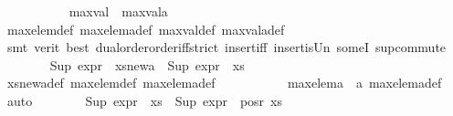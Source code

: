 \begin{isabellebody}
\ \ \ \ \ \ \ \ \isamarkupfalse%
\ {\isachardoublequoteopen}{}{\isachardoublequoteclose}\ {\isacartoucheopen}max{\isacharunderscore}{\kern0pt}val\ {\isasymle}\ max{\isacharunderscore}{\kern0pt}val{\isacharunderscore}{\kern0pt}a{\isacartoucheclose}\ {}\isanewline
\ \ \ \ \ \ \ \ \isamarkupfalse%
\ max{\isacharunderscore}{\kern0pt}elem{\isacharunderscore}{\kern0pt}def\ max{\isacharunderscore}{\kern0pt}elem{\isacharunderscore}{\kern0pt}a{\isacharunderscore}{\kern0pt}def\ max{\isacharunderscore}{\kern0pt}val{\isacharunderscore}{\kern0pt}def\ max{\isacharunderscore}{\kern0pt}val{\isacharunderscore}{\kern0pt}a{\isacharunderscore}{\kern0pt}def\isanewline
\ \ \ \ \ \ \ \ \isamarkupfalse%
\ {\isacharparenleft}{\kern0pt}smt\ {\isacharparenleft}{\kern0pt}verit{\isacharcomma}{\kern0pt}\ best{\isacharparenright}{\kern0pt}\ dual{\isacharunderscore}{\kern0pt}order{\isachardot}{\kern0pt}order{\isacharunderscore}{\kern0pt}iff{\isacharunderscore}{\kern0pt}strict\ insert{\isacharunderscore}{\kern0pt}iff\ insert{\isacharunderscore}{\kern0pt}is{\isacharunderscore}{\kern0pt}Un\ someI\ sup{\isachardot}{\kern0pt}commute{\isacharparenright}{\kern0pt}\isanewline
\ \ \ \ \ \ \isamarkupfalse%
\ {\isachardoublequoteopen}Sup\ {\isacharparenleft}{\kern0pt}expr{\isacharunderscore}{\kern0pt}{}\ {\isacharbackquote}{\kern0pt}\ xs{\isacharunderscore}{\kern0pt}new{\isacharunderscore}{\kern0pt}a{\isacharparenright}{\kern0pt}\ {\isasymge}\ Sup\ {\isacharparenleft}{\kern0pt}expr{\isacharunderscore}{\kern0pt}{}\ {\isacharbackquote}{\kern0pt}\ xs{\isacharparenright}{\kern0pt}{\isachardoublequoteclose}\isanewline
\ \ \ \ \ \ \ \ \isamarkupfalse%
\ xs{\isacharunderscore}{\kern0pt}new{\isacharunderscore}{\kern0pt}a{\isacharunderscore}{\kern0pt}def\ max{\isacharunderscore}{\kern0pt}elem{\isacharunderscore}{\kern0pt}def\ max{\isacharunderscore}{\kern0pt}elem{\isacharunderscore}{\kern0pt}a{\isacharunderscore}{\kern0pt}def\isanewline
\ \ \ \ \ \ \ \ \isamarkupfalse%
\ {\isachardoublequoteopen}{}{\isachardoublequoteclose}\ {\isacartoucheopen}max{\isacharunderscore}{\kern0pt}elem{\isacharunderscore}{\kern0pt}a\ {\isacharequal}{\kern0pt}\ a{\isacartoucheclose}\ max{\isacharunderscore}{\kern0pt}elem{\isacharunderscore}{\kern0pt}a{\isacharunderscore}{\kern0pt}def\ \isamarkupfalse%
\ auto\isanewline
\ \ \ \ \ \ \isamarkupfalse%
\ {\isachardoublequoteopen}Sup\ {\isacharparenleft}{\kern0pt}expr{\isacharunderscore}{\kern0pt}{}\ {\isacharbackquote}{\kern0pt}\ xs{\isacharparenright}{\kern0pt}\ {\isasymge}\ Sup\ {\isacharparenleft}{\kern0pt}expr{\isacharunderscore}{\kern0pt}{}\ {\isacharbackquote}{\kern0pt}\ {\isacharparenleft}{\kern0pt}pos{\isacharunderscore}{\kern0pt}r\ xs{\isacharparenright}{\kern0pt}{\isacharparenright}{\kern0pt}{\isachardoublequoteclose}\isanewline

\end{isabellebody}
